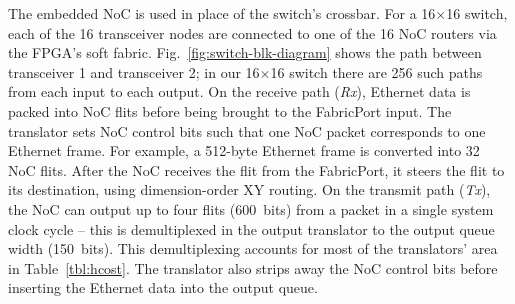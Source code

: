 The embedded NoC is used in place of the switch's crossbar.
For a 16$\times$16 switch, each of the 16 transceiver nodes are connected to one of the 16 NoC routers via the FPGA's soft fabric.
Fig.~\ref{fig:switch-blk-diagram} shows the path between transceiver 1 and transceiver 2; in our 16$\times$16 switch there are 256 such paths from each input to each output.
On the receive path (\textit{Rx}), Ethernet data is packed into NoC flits before being brought to the FabricPort input.
The translator sets NoC control bits such that one NoC packet corresponds to one Ethernet frame.
For example, a 512-byte Ethernet frame is converted into 32 NoC flits.
After the NoC receives the flit from the FabricPort, it steers the flit to its destination, using dimension-order XY routing.
On the transmit path (\textit{Tx}), the NoC can output up to four flits (600~bits) from a packet in a single system clock cycle -- this is demultiplexed in the output translator to the output queue width (150~bits).
This demultiplexing accounts for most of the translators' area in Table~\ref{tbl:hcost}.
The translator also strips away the NoC control bits before inserting the Ethernet data into the output queue.

